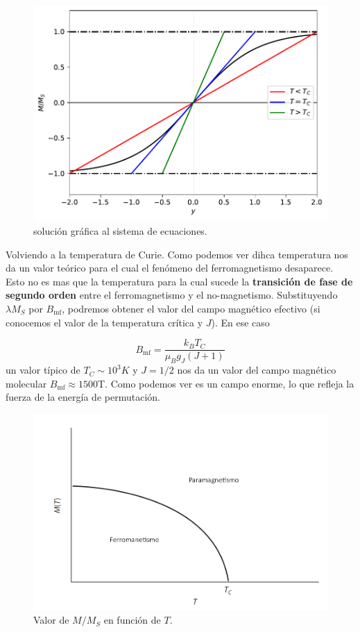 \documentclass[12pt,a4paper]{book}
\numberwithin{equation}{section}
\numberwithin{figure}{section}
\newcommand{\mf}{\mathrm{mf}}
\begin{document}
\begin{figure}[h!]
    \centering
    \includegraphics[scale=1]{Imagenes/05-TC.pdf}
    \caption{solución gráfica al sistema de ecuaciones.}
    \label{Fig:05-01-01}
\end{figure}


Volviendo a la temperatura de Curie. Como podemos ver dihca temperatura nos da un valor teórico para el cual el fenómeno del ferromagnetismo desaparece. Esto no es mas que la temperatura para la cual sucede la \textbf{transición de fase de segundo orden} entre el ferromagnetismo y el no-magnetismo. Substituyendo $\lambda M_S$ por $B_\mf$, podremos obtener el valor del campo magnético efectivo (si conocemos el valor de la temperatura crítica y $J$). En ese caso

\begin{equation}
    B_\mf = \frac{k_B T_C}{\mu_B g_J (J+1)}
\end{equation}
un valor típico de $T_C \sim 10^3K$ y $J=1/2$ nos da un valor del campo magnético molecular $B_\mf \approx 1500$T. Como podemos ver es un campo enorme, lo que refleja la fuerza de la energía de permutación. 

\begin{figure}[h!]
    \centering
    \includegraphics[scale=0.6]{05-Ferro.png}
    \caption{Valor de $M/M_S$ en función de $T$.}
    \label{Fig:05-01-02}
\end{figure}
\end{document}
